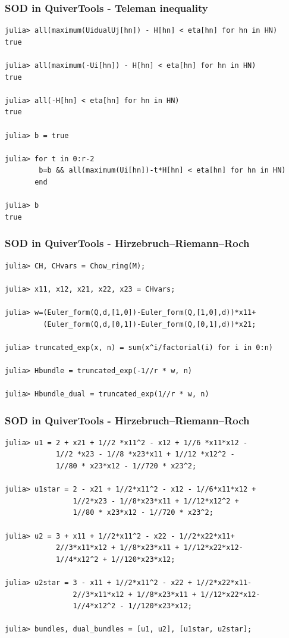 \documentclass{beamer}
\begin{document}
\begin{frame}[fragile]
    \frametitle{SOD in QuiverTools - Teleman inequality}
\scriptsize{
\begin{lstlisting}
julia> all(maximum(UidualUj[hn]) - H[hn] < eta[hn] for hn in HN)
true

julia> all(maximum(-Ui[hn]) - H[hn] < eta[hn] for hn in HN)
true

julia> all(-H[hn] < eta[hn] for hn in HN)
true

julia> b = true

julia> for t in 0:r-2
        b=b && all(maximum(Ui[hn])-t*H[hn] < eta[hn] for hn in HN)
       end

julia> b
true
\end{lstlisting}
}
\end{frame}

\begin{frame}[fragile]
    \frametitle{SOD in QuiverTools - Hirzebruch--Riemann--Roch}
\scriptsize{
\begin{lstlisting}
julia> CH, CHvars = Chow_ring(M);

julia> x11, x12, x21, x22, x23 = CHvars;

julia> w=(Euler_form(Q,d,[1,0])-Euler_form(Q,[1,0],d))*x11+
         (Euler_form(Q,d,[0,1])-Euler_form(Q,[0,1],d))*x21;

julia> truncated_exp(x, n) = sum(x^i/factorial(i) for i in 0:n)

julia> Hbundle = truncated_exp(-1//r * w, n)

julia> Hbundle_dual = truncated_exp(1//r * w, n)
\end{lstlisting}
}

\end{frame}

\begin{frame}[fragile]
    \frametitle{SOD in QuiverTools - Hirzebruch--Riemann--Roch}
\scriptsize{
\begin{lstlisting}
julia> u1 = 2 + x21 + 1//2 *x11^2 - x12 + 1//6 *x11*x12 -
            1//2 *x23 - 1//8 *x23*x11 + 1//12 *x12^2 -
            1//80 * x23*x12 - 1//720 * x23^2;

julia> u1star = 2 - x21 + 1//2*x11^2 - x12 - 1//6*x11*x12 +
                1//2*x23 - 1//8*x23*x11 + 1//12*x12^2 +
                1//80 * x23*x12 - 1//720 * x23^2;

julia> u2 = 3 + x11 + 1//2*x11^2 - x22 - 1//2*x22*x11+
            2//3*x11*x12 + 1//8*x23*x11 + 1//12*x22*x12-
            1//4*x12^2 + 1//120*x23*x12;

julia> u2star = 3 - x11 + 1//2*x11^2 - x22 + 1//2*x22*x11-
                2//3*x11*x12 + 1//8*x23*x11 + 1//12*x22*x12-
                1//4*x12^2 - 1//120*x23*x12;

julia> bundles, dual_bundles = [u1, u2], [u1star, u2star];
\end{lstlisting}
}
\end{frame}
\end{document}
